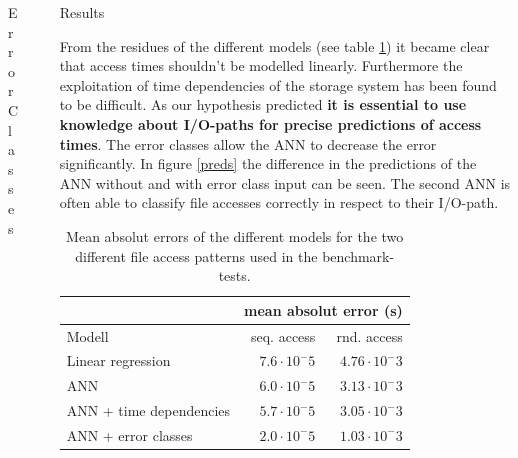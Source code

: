 \documentclass[final]{beamer}
\newlength{\sepwid}
\newlength{\onecolwid}
\begin{document}
\begin{frame}[t]
\begin{columns}[t]
\begin{column}{\onecolwid}
\begin{block}{Error Classes}

\end{block}

\end{column} %

\begin{column}{\sepwid}\end{column} %

\begin{column}{\onecolwid} %

\begin{block}{Results}
	
	From the residues of the different models (see table \ref{residues}) it became clear that access times shouldn't be modelled linearly.
	Furthermore the exploitation of time dependencies of the storage system has been found to be difficult.
	As our hypothesis predicted \textbf{it is essential to use knowledge about I/O-paths for precise predictions of access times}.
	The error classes allow the ANN to decrease the error significantly.
	In figure \ref{preds} the difference in the predictions of the ANN without and with error class input can be seen.
	The second ANN is often able to classify file accesses correctly in respect to their I/O-path.
	
	\begin{table}
		\vspace{0ex}
		\begin{tabular}{l|r|r}%
			&  \multicolumn{2}{|c}{mean absolut error (s)}\\ \hline
			Modell & seq. access & rnd. access\\ \hline
			Linear regression & $7.6\cdot 10^-5$ & $4.76\cdot 10^-3$ \\
			ANN & $6.0\cdot 10^-5$ & $3.13\cdot 10^-3$ \\
			ANN + time dependencies & $5.7\cdot 10^-5$ & $3.05\cdot 10^-3$\\
			ANN + error classes & $2.0\cdot 10^-5$ & $1.03\cdot 10^-3$ \\
		\end{tabular}
		\caption{Mean absolut errors of the different models for the two different file access patterns used in the benchmark-tests.}
		\label{residues}
	\end{table}
	

\end{block}
\end{column}
\end{columns}
\end{frame}
\end{document}
